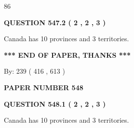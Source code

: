 \documentclass[12pt]{article}
\begin{document}
 
\noindent{}

86
 
 
  
\vspace{0.2in}
  
{\textbf{\Large{QUESTION
547.2 
 ( 2 , 2 , 3 )
}}}
  
  
 
 
\noindent{}
 
 
Canada has 10  provinces and 3 territories.
 
 
 
 
   
   
 \vspace{0.2in}
 
   
   
   
   
\vspace{1.0in} 
{\textbf{\large{ *** END OF PAPER, THANKS *** }}} 
   
   
\hspace{1.0in} By: 
 239 ( 416 ,  613 )
   
   
   
   
\newpage 
\setcounter{page}{ 
   548001 } 
   
   
   
   
 {\textbf{ \Large{ PAPER NUMBER  548  }}}
   
   
\vspace{0.2in}
   
   
   
   
   
   
 \vspace{0.2in}
 
 
 
 
   
   
  
\vspace{0.2in}
  
{\textbf{\Large{QUESTION
548.1 
 ( 2 , 2 , 3 )
}}}
  
  
 
 
\noindent{}
 
 
Canada has 10  provinces and 3 territories.
 
\end{document}
